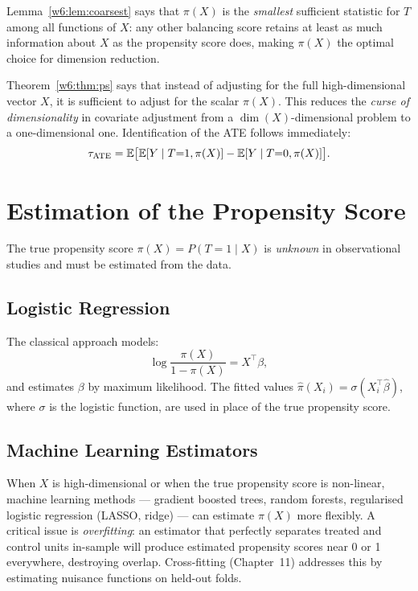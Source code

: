 \documentclass[master.tex]{subfiles}
\begin{document}
\noindent Lemma~\ref{w6:lem:coarsest} says that $\pi(X)$ is the
\emph{smallest} sufficient statistic for $T$ among all functions of
$X$: any other balancing score retains at least as much information
about $X$ as the propensity score does, making $\pi(X)$ the optimal
choice for dimension reduction.

\begin{tcolorbox}[defstyle, title={The Dimension Reduction}]
Theorem~\ref{w6:thm:ps} says that instead of adjusting for the full
high-dimensional vector $X$, it is sufficient to adjust for the scalar
$\pi(X)$.  This reduces the \emph{curse of dimensionality} in covariate
adjustment from a $\dim(X)$-dimensional problem to a one-dimensional
one.  Identification of the ATE follows immediately:
\[
  \tau_{\mathrm{ATE}}
  = \mathbb{E}\bigl[\mathbb{E}[Y \mid T{=}1, \pi(X)] - \mathbb{E}[Y \mid T{=}0, \pi(X)]\bigr].
\]
\end{tcolorbox}

\section{Estimation of the Propensity Score}

The true propensity score $\pi(X) = P(T{=}1 \mid X)$ is \emph{unknown}
in observational studies and must be estimated from the data.

\subsection*{Logistic Regression}

The classical approach models:
\[
  \log\frac{\pi(X)}{1 - \pi(X)} = X^\top \beta,
\]
and estimates $\beta$ by maximum likelihood.  The fitted values
$\hat\pi(X_i) = \sigma(X_i^\top \hat\beta)$, where $\sigma$ is the
logistic function, are used in place of the true propensity score.

\subsection*{Machine Learning Estimators}

When $X$ is high-dimensional or when the true propensity score is
non-linear, machine learning methods --- gradient boosted trees, random
forests, regularised logistic regression (LASSO, ridge) --- can estimate
$\pi(X)$ more flexibly.  A critical issue is \emph{overfitting}: an
estimator that perfectly separates treated and control units in-sample
will produce estimated propensity scores near 0 or 1 everywhere,
destroying overlap.  Cross-fitting (Chapter~11) addresses this by
estimating nuisance functions on held-out folds.
\end{document}
